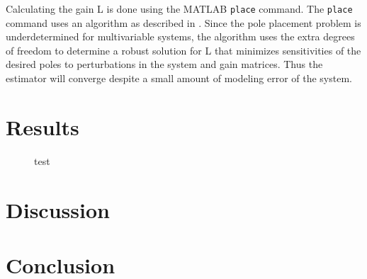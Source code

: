 \documentclass[letterpaper,11pt]{article}
\begin{document}
Calculating the gain L is done using the MATLAB \verb|place| command. The \verb|place|
command uses an algorithm as described in \cite{Kautsky1985}. Since the pole
placement problem is underdetermined for multivariable systems, the algorithm
uses the extra degrees of freedom to determine a robust solution for L that
minimizes sensitivities of the desired poles to perturbations in the system and
gain matrices. Thus the estimator will converge despite a small amount of
modeling error of the system.


\section{Results} \label{sec:results}
\begin{figure}
  \pgfplotsset{set layers}
  \runzero
  \centering
  \caption{test}
  \label{rb:fig:run000a}
\end{figure}

\section{Discussion} \label{sec:discussion}

\section{Conclusion} \label{sec:conclusion}

\printbibliography
\end{document}
